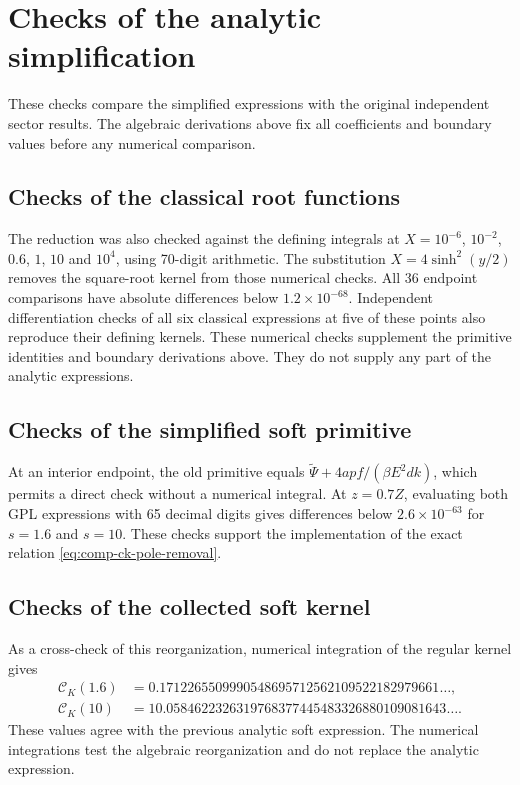 \section{Checks of the analytic simplification}
These checks compare the simplified expressions with the original
independent sector results. The algebraic derivations above fix all
coefficients and boundary values before any numerical comparison.

\subsection{Checks of the classical root functions}
The reduction was also checked against the defining integrals at
$X=10^{-6}$, $10^{-2}$, $0.6$, $1$, $10$ and $10^4$, using 70-digit arithmetic.
The substitution $X=4\sinh^2(y/2)$ removes the square-root kernel
from those numerical checks. All 36 endpoint comparisons have absolute
differences below $1.2\times10^{-68}$. Independent differentiation
checks of all six classical expressions at five of these points also
reproduce their defining kernels. These numerical checks supplement
the primitive identities and boundary derivations above. They do not
supply any part of the analytic expressions.

\subsection{Checks of the simplified soft primitive}
At an interior endpoint, the old primitive equals
$\widetilde\Psi+4apf/(\beta E^2dk)$, which permits a direct check
without a numerical integral.  At $z=0.7Z$, evaluating both GPL
expressions with 65 decimal digits gives differences below
$2.6\times10^{-63}$ for $s=1.6$ and $s=10$.  These checks support
the implementation of the exact relation
\eqref{eq:comp-ck-pole-removal}.

\subsection{Checks of the collected soft kernel}
As a cross-check of this reorganization, numerical integration of the
regular kernel gives
\begin{align}
 \mathcal C_K(1.6)&=0.1712265509990548695712562109522182979661\ldots,\\
 \mathcal C_K(10)&=10.0584622326319768377445483326880109081643\ldots.
\end{align}
These values agree with the previous analytic soft expression.
The numerical integrations test the algebraic reorganization and do
not replace the analytic expression.

